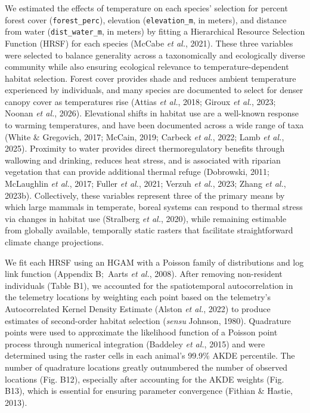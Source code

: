 \documentclass[
  12pt,
]{article}
\begin{document}
\noindent We estimated the effects of temperature on each species' selection for percent forest cover (\texttt{forest\_perc}), elevation (\texttt{elevation\_m}, in meters), and distance from water (\texttt{dist\_water\_m}, in meters) by fitting a Hierarchical Resource Selection Function (HRSF) for each species (McCabe \emph{et al.}, 2021). These three variables were selected to balance generality across a taxonomically and ecologically diverse community while also ensuring ecological relevance to temperature-dependent habitat selection. Forest cover provides shade and reduces ambient temperature experienced by individuals, and many species are documented to select for denser canopy cover as temperatures rise (Attias \emph{et al.}, 2018; Giroux \emph{et al.}, 2023; Noonan \emph{et al.}, 2026). Elevational shifts in habitat use are a well-known response to warming temperatures, and have been documented across a wide range of taxa (White \& Gregovich, 2017; McCain, 2019; Carbeck \emph{et al.}, 2022; Lamb \emph{et al.}, 2025). Proximity to water provides direct thermoregulatory benefits through wallowing and drinking, reduces heat stress, and is associated with riparian vegetation that can provide additional thermal refuge (Dobrowski, 2011; McLaughlin \emph{et al.}, 2017; Fuller \emph{et al.}, 2021; Verzuh \emph{et al.}, 2023; Zhang \emph{et al.}, 2023b). Collectively, these variables represent three of the primary means by which large mammals in temperate, boreal systems can respond to thermal stress via changes in habitat use (Stralberg \emph{et al.}, 2020), while remaining estimable from globally available, temporally static rasters that facilitate straightforward climate change projections.

We fit each HRSF using an HGAM with a Poisson family of distributions and log link function (Appendix B\(;\) Aarts \emph{et al.}, 2008). After removing non-resident individuals (Table B1), we accounted for the spatiotemporal autocorrelation in the telemetry locations by weighting each point based on the telemetry's Autocorrelated Kernel Density Estimate (Alston \emph{et al.}, 2022) to produce estimates of second-order habitat selection (\emph{sensu} Johnson, 1980). Quadrature points were used to approximate the likelihood function of a Poisson point process through numerical integration (Baddeley \emph{et al.}, 2015) and were determined using the raster cells in each animal's 99.9\% AKDE percentile. The number of quadrature locations greatly outnumbered the number of observed locations (Fig. B12), especially after accounting for the AKDE weights (Fig. B13), which is essential for ensuring parameter convergence (Fithian \& Hastie, 2013).
\end{document}
